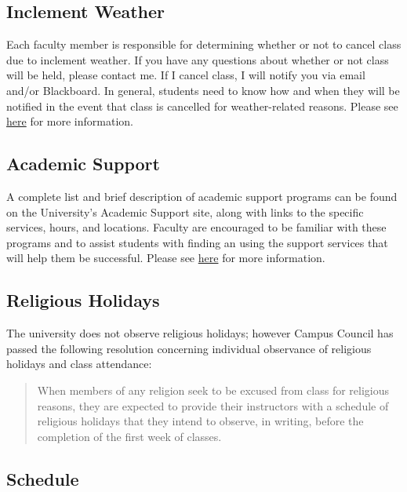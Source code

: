 \documentclass[
  letterpaper,
  DIV=11,
  numbers=noendperiod]{scrartcl}
\begin{document}
\hypertarget{inclement-weather}{%
\subsection{Inclement Weather}\label{inclement-weather}}

Each faculty member is responsible for determining whether or not to
cancel class due to inclement weather. If you have any questions about
whether or not class will be held, please contact me. If I cancel class,
I will notify you via email and/or Blackboard. In general, students need
to know how and when they will be notified in the event that class is
cancelled for weather-related reasons. Please see
\href{http://safety.uark.edu/inclement-weather/}{here} for more
information.

\hypertarget{academic-support}{%
\subsection{Academic Support}\label{academic-support}}

A complete list and brief description of academic support programs can
be found on the University's Academic Support site, along with links to
the specific services, hours, and locations. Faculty are encouraged to
be familiar with these programs and to assist students with finding an
using the support services that will help them be successful. Please see
\href{http://www.uark.edu/academics/academic-support.php}{here} for more
information.

\hypertarget{religious-holidays}{%
\subsection{Religious Holidays}\label{religious-holidays}}

The university does not observe religious holidays; however Campus
Council has passed the following resolution concerning individual
observance of religious holidays and class attendance:

\begin{quote}
When members of any religion seek to be excused from class for religious
reasons, they are expected to provide their instructors with a schedule
of religious holidays that they intend to observe, in writing, before
the completion of the first week of classes.
\end{quote}

\hypertarget{schedule}{%
\subsection{Schedule}\label{schedule}}
\end{document}
